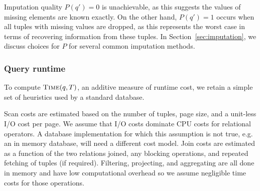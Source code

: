 Imputation quality $P(q')=0$ is unachievable, as this suggests the values of missing elements are known exactly. On the other hand, $P(q')=1$ occurs when all tuples with missing values are dropped, as this represents the worst case in terms of recovering information from these tuples.
In Section~\ref{sec:imputation}, we discuss choices for $P$ for several common imputation methods.

\subsubsection{Query runtime}
To compute $\textsc{Time}(q, T)$, an additive measure of runtime cost, we retain a simple set of heuristics used by a standard database.


Scan costs are estimated based on the number of tuples, page size, and a unit-less I/O cost per page. 
We assume that I/O costs dominate CPU costs for relational operators. 
A database implementation for which this assumption is not true, e.g. an in memory database, will need a different cost model.
Join costs are estimated as a function of the two relations joined, any blocking operations, and repeated fetching of tuples (if required).
Filtering, projecting, and aggregating are all done in memory and have low computational overhead so we assume negligible time costs for those operations. 

